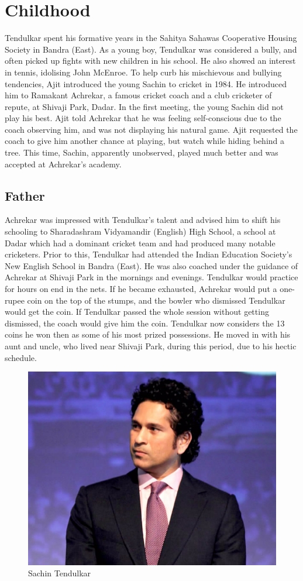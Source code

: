 \documentclass[a4paper,15pt]{report}
\begin{document}
\section{Childhood}
Tendulkar spent his formative years in the Sahitya Sahawas Cooperative Housing Society in Bandra (East). As a young boy, Tendulkar was considered a bully, and often picked up fights with new children in his school. He also showed an interest in tennis, idolising John McEnroe. To help curb his mischievous and bullying tendencies, Ajit introduced the young Sachin to cricket in 1984. He introduced him to Ramakant Achrekar, a famous cricket coach and a club cricketer of repute, at Shivaji Park, Dadar. In the first meeting, the young Sachin did not play his best. Ajit told Achrekar that he was feeling self-conscious due to the coach observing him, and was not displaying his natural game. Ajit requested the coach to give him another chance at playing, but watch while hiding behind a tree. This time, Sachin, apparently unobserved, played much better and was accepted at Achrekar's academy.
\subsection{Father}
Achrekar was impressed with Tendulkar's talent and advised him to shift his schooling to Sharadashram Vidyamandir (English) High School, a school at Dadar which had a dominant cricket team and had produced many notable cricketers. Prior to this, Tendulkar had attended the Indian Education Society's New English School in Bandra (East). He was also coached under the guidance of Achrekar at Shivaji Park in the mornings and evenings. Tendulkar would practice for hours on end in the nets. If he became exhausted, Achrekar would put a one-rupee coin on the top of the stumps, and the bowler who dismissed Tendulkar would get the coin. If Tendulkar passed the whole session without getting dismissed, the coach would give him the coin. Tendulkar now considers the 13 coins he won then as some of his most prized possessions. He moved in with his aunt and uncle, who lived near Shivaji Park, during this period, due to his hectic schedule.

\begin{figure}
	\centering
	\caption{Sachin Tendulkar}
\includegraphics[scale=0.15]{sachin-01.jpg}
\end{figure}
\end{document}
